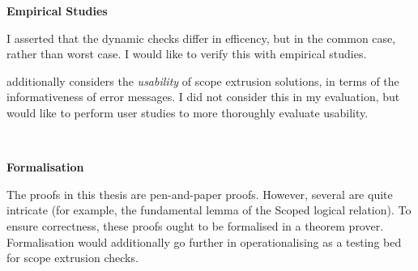 \noindent\begin{minipage}[t]{0.25\textwidth}
  \textbf{\textsf{Empirical Studies}}
\end{minipage}%
\begin{minipage}[t]{0.75\textwidth}
  I asserted that the dynamic checks differ in efficency, but in the common case, rather than worst case. I would like to verify this with empirical studies.
  \vspace{2mm}

  \citet{kiselyov-14} additionally considers the \textit{usability} of scope extrusion solutions, in terms of the informativeness of error messages. I did not consider this in my evaluation, but would like to perform user studies to more thoroughly evaluate usability.
  \vspace{4mm}
\end{minipage}\\

\noindent\begin{minipage}[t]{0.25\textwidth}
  \textbf{\textsf{Formalisation}}
\end{minipage}%
\begin{minipage}[t]{0.75\textwidth}
  The proofs in this thesis are pen-and-paper proofs. However, several are quite intricate (for example, the fundamental lemma of the \textsf{Scoped} logical relation). To ensure correctness, these proofs ought to be formalised in a theorem prover. Formalisation would additionally go further in operationalising \sourceLang{} as a testing bed for scope extrusion checks.
\end{minipage}







